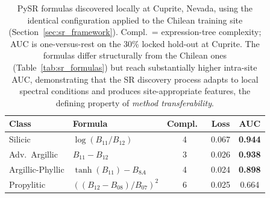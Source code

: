 \documentclass[preprint,authoryear,number]{elsarticle}
\begin{document}
\begin{table}[ht]
\centering
\caption{PySR formulas discovered locally at Cuprite, Nevada, using the identical configuration applied to the Chilean training site (Section~\ref{sec:sr_framework}). Compl.\ = expression-tree complexity; AUC is one-versus-rest on the 30\% locked hold-out at Cuprite. The formulas differ structurally from the Chilean ones (Table~\ref{tab:sr_formulas}) but reach substantially higher intra-site AUC, demonstrating that the SR discovery process adapts to local spectral conditions and produces site-appropriate features, the defining property of \emph{method transferability}.}
\label{tab:cuprite_formulas}
\begin{tabular}{llccc}
\toprule
Class & Formula & Compl.\ & Loss & AUC \\
\midrule
Silicic          & $\log(B_{11}/B_{12})$                    & 4 & 0.067 & \textbf{0.944} \\
Adv.\ Argillic   & $B_{11} - B_{12}$                        & 3 & 0.026 & \textbf{0.938} \\
Argillic-Phyllic & $\tanh(B_{11}) - B_{8A}$                 & 4 & 0.024 & \textbf{0.898} \\
Propylitic       & $((B_{12} - B_{08})/B_{07})^2$           & 6 & 0.025 & 0.664 \\
\bottomrule
\end{tabular}
\end{table}
\end{document}
